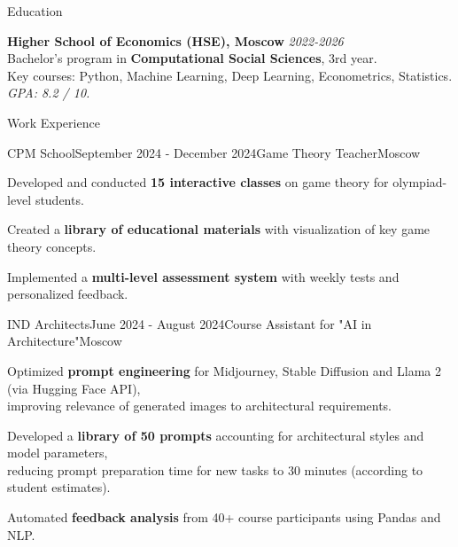 \documentclass[10pt]{resume} %
\begin{document}
\begin{rSection}{Education}
    
    \textbf{Higher School of Economics (HSE), Moscow} \hfill \textit{2022-2026} \\ 
    Bachelor's program in \textbf{Computational Social Sciences}, 3rd year. \\
    Key courses: Python, Machine Learning, Deep Learning, Econometrics, Statistics. \\
    \textit{GPA: 8.2 / 10.}
    
\end{rSection}


\begin{rSection}{Work Experience}

\begin{rSubsection}{CPM School}{September 2024 - December 2024}{Game Theory Teacher}{Moscow}
\item Developed and conducted \textbf{15 interactive classes} on game theory for olympiad-level students.
\item Created a \textbf{library of educational materials} with visualization of key game theory concepts.
\item Implemented a \textbf{multi-level assessment system} with weekly tests and personalized feedback.
\end{rSubsection}

    \begin{rSubsection}{IND Architects}{June 2024 - August 2024}{Course Assistant for "AI in Architecture"}{Moscow}
        \item Optimized \textbf{prompt engineering} for Midjourney, Stable Diffusion and Llama 2 (via Hugging Face API), \\ improving relevance of generated images to architectural requirements.
        \item Developed a \textbf{library of 50 prompts} accounting for architectural styles and model parameters, \\ reducing prompt preparation time for new tasks to 30 minutes (according to student estimates).
        \item Automated \textbf{feedback analysis} from 40+ course participants using Pandas and NLP.
    \end{rSubsection}

\end{rSection}
\end{document}
